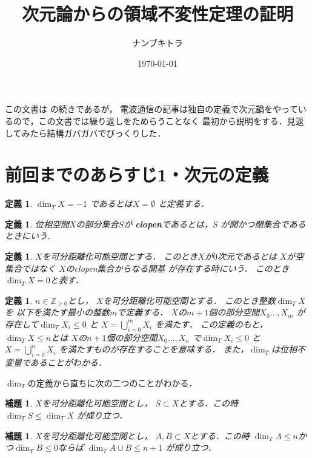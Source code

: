 \documentclass[leqno, a4paper, 12pt]{jsarticle}
\title{
次元論からの領域不変性定理の証明
}
\author{ナンブキトラ}
\date{\today}
\newtheorem{lem}[thm]{補題}
\newtheorem{df}[thm]{定義}
\newcommand{\zz}{\mathbb{Z}}
\numberwithin{equation}{section}
\begin{document}
\maketitle


この文書は
\cite{dempa}の続きであるが，
電波通信の記事\cite{dempa}は独自の定義で次元論をやっているので，この文書では繰り返しをためらうことなく
最初から説明をする．見返してみたら結構ガバガバでびっくりした．

\tableofcontents

\section{前回までのあらすじ1・次元の定義}
\begin{df}
$\dim_{T} X=-1$
であるとは$X=\emptyset$
と定義する．
\end{df}

\begin{df}
位相空間$X$の部分集合$S$が
\textbf{clopen}であるとは，$S$
が開かつ閉集合であるときにいう．
\end{df}

\begin{df}
$X$を可分距離化可能空間とする．
このとき$X$が$0$次元であるとは
$X$が空集合ではなく
$X$のclopen集合からなる開基
が存在する時にいう．
このとき$\dim_{T} X=0$と表す．
\end{df}


\begin{df}
$n\in \zz_{\ge 0}$とし，
$X$を可分距離化可能空間とする．
このとき整数$\dim_{T}X$を
以下を満たす最小の整数$m$で定義する．
$X$の$m+1$個の部分空間$X_{0}\dots, X_{m}$
が存在して$\dim_{T}X_{i}\le 0$
と
$X=\bigcup_{i=0}^{m}X_{i}$
を満たす．
この定義のもと，$\dim_{T}X\le n$とは
$X$の$n+1$個の部分空間$X_{0}\dots, X_{n}$
で$\dim_{T}X_{i}\le 0$
と
$X=\bigcup_{i=0}^{n}X_{i}$
を満たすものが存在することを意味する．
また，$\dim_{T}$は位相不変量であることがわかる．
\end{df}

$\dim_{T}$の定義から直ちに次の二つのことがわかる．
\begin{lem}
$X$を可分距離化可能空間とし，
$S\subset X$とする．この時
$\dim_{T}S\le \dim_{T}X$
が成り立つ．
\end{lem}

\begin{lem}\label{lem:plpl}
$X$を可分距離化可能空間とし，
$A, B\subset X$とする．この時
$\dim_{T}A\le n$かつ$\dim_{T}B\le 0$ならば
$\dim_{T}A\cup B\le n+1$
が成り立つ．
\end{lem}
\end{document}
